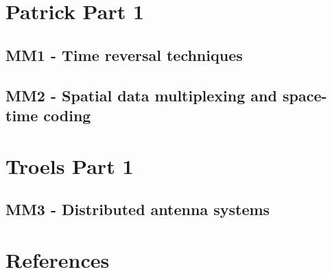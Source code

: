 



    \singlespacing
    \pagestyle{empty}	
	
	\cleardoublepage
	
	\pagestyle{plain}
		
	\tableofcontents 
	\onehalfspacing
	\pagestyle{fancy} %
    \setcounter{page}{0} %

\part{Patrick Part 1}

\chapter{MM1 - Time reversal techniques}







\chapter{MM2 - Spatial data multiplexing and space-time coding}






\part{Troels Part 1}

\chapter{MM3 - Distributed antenna systems}









\part{References}






